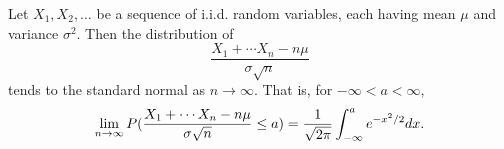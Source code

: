\documentclass[11pt, a4paper, oneside]{book}
\theoremstyle{definition}
\begin{document}
\noindent Let $X_1, X_2, \dots$ be a sequence of i.i.d. random variables, each having mean $\mu$ and variance $\sigma^2$. Then the distribution of \[
\frac{X_1 + \cdots X_n - n\mu}{\sigma \sqrt{n}}
\]
tends to the standard normal as $n \to \infty$. That is, for $-\infty < a < \infty$,\[
\lim_{n \to \infty} P\huge( \frac{X_1 + \cdots X_n - n\mu}{\sigma \sqrt{n}} \le a \huge) = \frac{1}{\sqrt{2\pi}}\int_{-\infty}^a e^{-x^2/2}dx.
\]



\backmatter
\end{document}
